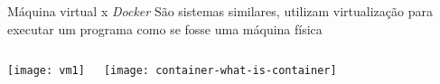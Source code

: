 \begin{frame}[t]{Máquina virtual x \textit{Docker}}
    São sistemas similares, utilizam virtualização para executar um programa como se fosse uma máquina física    \cite{dock}
    \begin{columns} 
            \begin{center}
                \texttt{[image: vm1]}
            \end{center}
            \begin{center}
                \texttt{[image: container-what-is-container]}
            \end{center}
    \end{columns}
\end{frame}